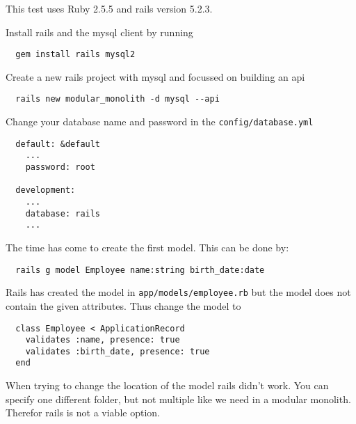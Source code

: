This test uses Ruby 2.5.5 and rails version 5.2.3.

Install rails and the mysql client by running
\begin{verbatim}
  gem install rails mysql2
\end{verbatim}

Create a new rails project with mysql and focussed on building an api
\begin{verbatim}
  rails new modular_monolith -d mysql --api
\end{verbatim}

Change your database name and password in the \texttt{config/database.yml}
\begin{verbatim}
  default: &default
    ...
    password: root

  development:
    ...
    database: rails
    ...
\end{verbatim}

The time has come to create the first model. This can be done by:
\begin{verbatim}
  rails g model Employee name:string birth_date:date
\end{verbatim}

Rails has created the model in \texttt{app/models/employee.rb} but the model does not contain the given attributes. Thus change the model to
\begin{verbatim}
  class Employee < ApplicationRecord
    validates :name, presence: true
    validates :birth_date, presence: true
  end
\end{verbatim}

When trying to change the location of the model rails didn't work. You can specify one different folder, but not multiple like we need in a modular monolith. Therefor rails is not a viable option.
